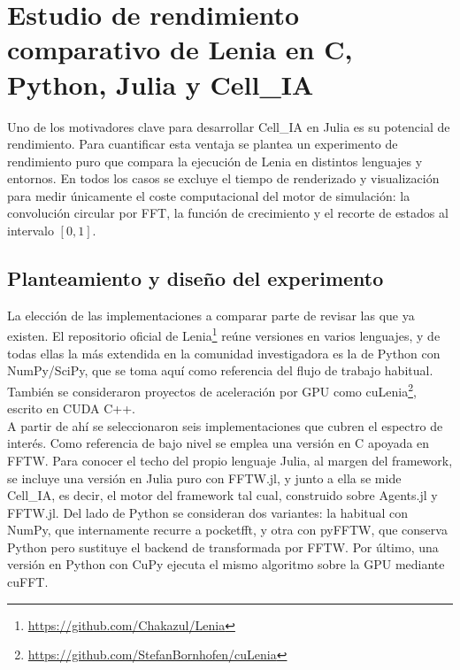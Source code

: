 \documentclass[runningheads]{llncs}
\begin{document}
\section{Estudio de rendimiento comparativo de Lenia en C, Python, Julia y Cell\_IA}
\label{sec:rendimiento_lenia}
Uno de los motivadores clave para desarrollar Cell\_IA en Julia es su potencial de rendimiento. Para cuantificar esta ventaja se plantea un experimento de rendimiento puro que compara la ejecución de Lenia \cite{ref_lenia} en distintos lenguajes y entornos. En todos los casos se excluye el tiempo de renderizado y visualización para medir únicamente el coste computacional del motor de simulación: la convolución circular por FFT, la función de crecimiento y el recorte de estados al intervalo $[0,1]$.\\

\subsection{Planteamiento y diseño del experimento}
\label{sec:rendimiento_planteamiento}

La elección de las implementaciones a comparar parte de revisar las que ya existen. El repositorio oficial de Lenia\footnote{\url{https://github.com/Chakazul/Lenia}} reúne versiones en varios lenguajes, y de todas ellas la más extendida en la comunidad investigadora es la de Python con NumPy/SciPy, que se toma aquí como referencia del flujo de trabajo habitual. También se consideraron proyectos de aceleración por GPU como cuLenia\footnote{\url{https://github.com/StefanBornhofen/cuLenia}}, escrito en CUDA C++.\\

A partir de ahí se seleccionaron seis implementaciones que cubren el espectro de interés. Como referencia de bajo nivel se emplea una versión en C apoyada en FFTW. Para conocer el techo del propio lenguaje Julia, al margen del framework, se incluye una versión en Julia puro con FFTW.jl, y junto a ella se mide Cell\_IA, es decir, el motor del framework tal cual, construido sobre Agents.jl y FFTW.jl. Del lado de Python se consideran dos variantes: la habitual con NumPy, que internamente recurre a pocketfft, y otra con pyFFTW, que conserva Python pero sustituye el backend de transformada por FFTW. Por último, una versión en Python con CuPy ejecuta el mismo algoritmo sobre la GPU mediante cuFFT.\\
\end{document}
